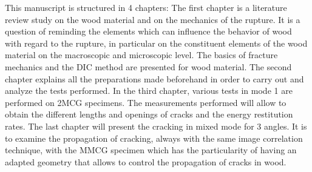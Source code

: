 This manuscript is structured in 4 chapters: 
The first chapter is a literature review study on the wood material and on the mechanics of the rupture. It is a question of reminding the elements which can influence the behavior of wood with regard to the rupture, in particular on the constituent elements of the wood material on the macroscopic and microscopic level. The basics of fracture mechanics and the DIC method are presented for wood material.
The second chapter explains all the preparations made beforehand in order to carry out and analyze the tests performed.
In the third chapter, various tests in mode 1 are performed on 2MCG specimens. The measurements performed will allow to obtain the different lengths and openings of cracks and the energy restitution rates.
The last chapter will present the cracking in mixed mode for 3 angles. It is to examine the propagation of cracking, always with the same image correlation technique, with the MMCG specimen which has the particularity of having an adapted geometry that allows to control the propagation of cracks in wood.

